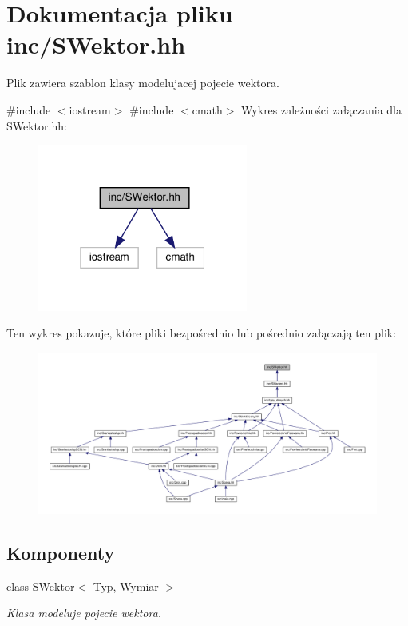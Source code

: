\hypertarget{SWektor_8hh}{}\section{Dokumentacja pliku inc/\+S\+Wektor.hh}
\label{SWektor_8hh}


Plik zawiera szablon klasy modelujacej pojecie wektora.  


{\ttfamily \#include $<$iostream$>$}\newline
{\ttfamily \#include $<$cmath$>$}\newline
Wykres zależności załączania dla S\+Wektor.\+hh\+:\nopagebreak
\begin{figure}[H]
\begin{center}
\leavevmode
\includegraphics[width=196pt]{SWektor_8hh__incl}
\end{center}
\end{figure}
Ten wykres pokazuje, które pliki bezpośrednio lub pośrednio załączają ten plik\+:\nopagebreak
\begin{figure}[H]
\begin{center}
\leavevmode
\includegraphics[width=350pt]{SWektor_8hh__dep__incl}
\end{center}
\end{figure}
\subsection*{Komponenty}
\begin{DoxyCompactItemize}
\item 
class \hyperlink{classSWektor}{S\+Wektor$<$ Typ, Wymiar $>$}
\begin{DoxyCompactList}\small\item\em Klasa modeluje pojecie wektora. \end{DoxyCompactList}\end{DoxyCompactItemize}
